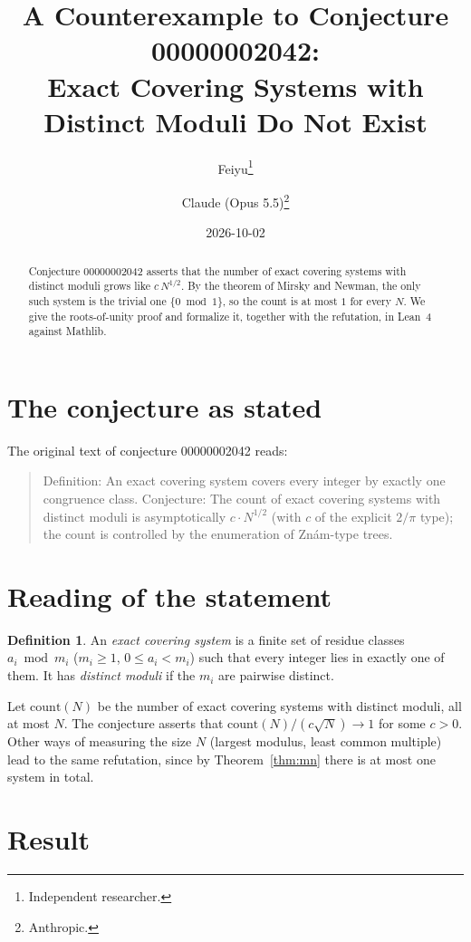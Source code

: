 \documentclass[11pt]{article}
\title{A Counterexample to Conjecture 00000002042:\\
Exact Covering Systems with Distinct Moduli Do Not Exist}
\author{%
  Feiyu\thanks{Independent researcher.}
  \and
  Claude (Opus 5.5)\thanks{Anthropic.}%
}
\date{2026-10-02}
\theoremstyle{plain}
\theoremstyle{definition}
\newtheorem{definition}[theorem]{Definition}
\theoremstyle{remark}
\begin{document}
\maketitle

\begin{abstract}
Conjecture 00000002042 asserts that the number of exact covering systems with
distinct moduli grows like $c\,N^{1/2}$. By the theorem of Mirsky and Newman,
the only such system is the trivial one $\{0\bmod 1\}$, so the count is at most
$1$ for every $N$. We give the roots-of-unity proof and formalize it, together
with the refutation, in Lean~4 against Mathlib.
\end{abstract}

\section{The conjecture as stated}

The original text of conjecture 00000002042 reads:

\begin{quote}
Definition: An exact covering system covers every integer by exactly one
congruence class. Conjecture: The count of exact covering systems with distinct
moduli is asymptotically $c\cdot N^{1/2}$ (with $c$ of the explicit $2/\pi$
type); the count is controlled by the enumeration of Zn\'am-type trees.
\end{quote}

\section{Reading of the statement}

\begin{definition}
An \emph{exact covering system} is a finite set of residue classes $a_i\bmod
m_i$ ($m_i\ge1$, $0\le a_i<m_i$) such that every integer lies in exactly one of
them. It has \emph{distinct moduli} if the $m_i$ are pairwise distinct.
\end{definition}

Let $\mathrm{count}(N)$ be the number of exact covering systems with distinct
moduli, all at most $N$. The conjecture asserts that
$\mathrm{count}(N)/(c\sqrt N)\to1$ for some $c>0$. Other ways of measuring the
size $N$ (largest modulus, least common multiple) lead to the same refutation,
since by Theorem~\ref{thm:mn} there is at most one system in total.

\section{Result}
\end{document}
